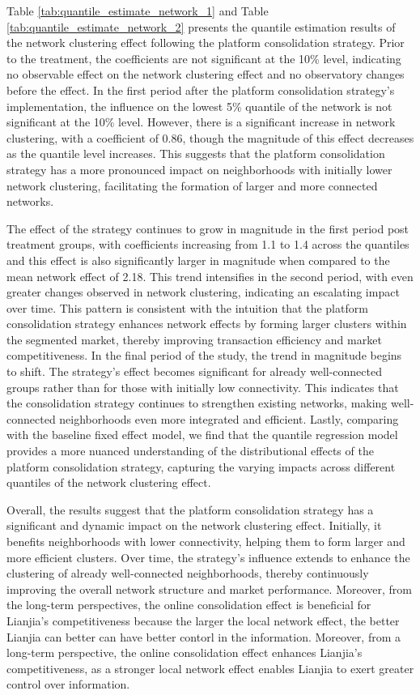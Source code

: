 \documentclass[11pt]{article}
\begin{document}
Table \ref{tab:quantile_estimate_network_1} and Table \ref{tab:quantile_estimate_network_2} presents the quantile estimation results of the network clustering effect following the platform consolidation strategy. Prior to the treatment, the coefficients are not significant at the 10\% level, indicating no observable effect on the network clustering effect and no observatory changes before the effect. In the first period after the platform consolidation strategy's implementation, the influence on the lowest 5\% quantile of the network is not significant at the 10\% level. However, there is a significant increase in network clustering, with a coefficient of 0.86, though the magnitude of this effect decreases as the quantile level increases. This suggests that the platform consolidation strategy has a more pronounced impact on neighborhoods with initially lower network clustering, facilitating the formation of larger and more connected networks.

The effect of the strategy continues to grow in magnitude in the first period post treatment groups, with coefficients increasing from 1.1 to 1.4 across the quantiles and this effect is also significantly larger in magnitude when compared to the mean network effect of 2.18. This trend intensifies in the second period, with even greater changes observed in network clustering, indicating an escalating impact over time. This pattern is consistent with the intuition that the platform consolidation strategy enhances network effects by forming larger clusters within the segmented market, thereby improving transaction efficiency and market competitiveness. In the final period of the study, the trend in magnitude begins to shift. The strategy's effect becomes significant for already well-connected groups rather than for those with initially low connectivity. This indicates that the consolidation strategy continues to strengthen existing networks, making well-connected neighborhoods even more integrated and efficient. Lastly, comparing with the baseline fixed effect model, we find that the quantile regression model provides a more nuanced understanding of the distributional effects of the platform consolidation strategy, capturing the varying impacts across different quantiles of the network clustering effect.

Overall, the results suggest that the platform consolidation strategy has a significant and dynamic impact on the network clustering effect. Initially, it benefits neighborhoods with lower connectivity, helping them to form larger and more efficient clusters. Over time, the strategy's influence extends to enhance the clustering of already well-connected neighborhoods, thereby continuously improving the overall network structure and market performance. Moreover, from the long-term perspectives, the online consolidation effect is beneficial for Lianjia's competitiveness because the larger the local network effect, the better Lianjia can better can have better contorl in the information. Moreover, from a long-term perspective, the online consolidation effect enhances Lianjia's competitiveness, as a stronger local network effect enables Lianjia to exert greater control over information.
\end{document}
